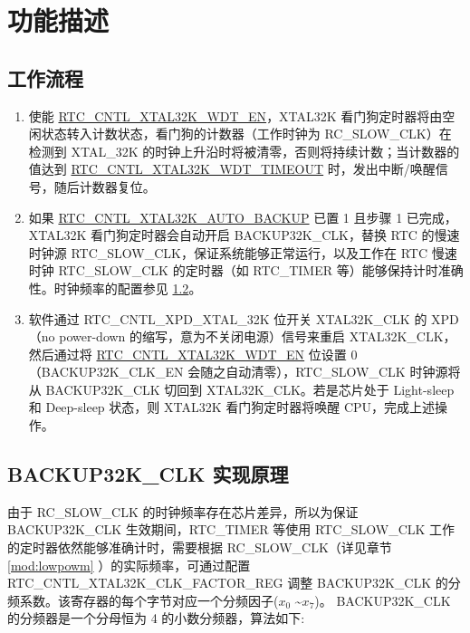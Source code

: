 \documentclass[main\_\_CN.tex]{subfiles}
\begin{document}
\section{功能描述}

\subsection{工作流程}

\begin{enumerate}
    \item 使能 \hyperref[fielddesc:RTCCNTLXTAL32KWDTEN]{RTC\_CNTL\_XTAL32K\_WDT\_EN}，XTAL32K 看门狗定时器将由空闲状态转入计数状态，看门狗的计数器（工作时钟为 RC\_SLOW\_CLK）在检测到 XTAL\_32K 的时钟上升沿时将被清零，否则将持续计数；当计数器的值达到 \hyperref[fielddesc:RTCCNTLXTAL32KWDTTIMEOUT]{RTC\_CNTL\_XTAL32K\_WDT\_TIMEOUT} 时，发出中断/唤醒信号，随后计数器复位。
    \item 如果 \hyperref[fielddesc:RTCCNTLXTAL32KAUTOBACKUP]{RTC\_CNTL\_XTAL32K\_AUTO\_BACKUP} 已置 1 且步骤 1 已完成，XTAL32K 看门狗定时器会自动开启 BACKUP32K\_CLK，替换 RTC 的慢速时钟源 RTC\_SLOW\_CLK，保证系统能够正常运行，以及工作在 RTC 慢速时钟 RTC\_SLOW\_CLK 的定时器（如 RTC\_TIMER 等）能够保持计时准确性。时钟频率的配置参见 \ref{sec:xtwdt-divisor-config}。
    \item 软件通过 RTC\_CNTL\_XPD\_XTAL\_32K 位开关 XTAL32K\_CLK 的 XPD（no power-down 的缩写，意为不关闭电源）信号来重启 XTAL32K\_CLK，然后通过将 \hyperref[fielddesc:RTCCNTLXTAL32KWDTEN]{RTC\_CNTL\_XTAL32K\_WDT\_EN} 位设置 0（BACKUP32K\_CLK\_EN 会随之自动清零），RTC\_SLOW\_CLK 时钟源将从 BACKUP32K\_CLK 切回到 XTAL32K\_CLK。若是芯片处于 Light-sleep 和 Deep-sleep 状态，则 XTAL32K 看门狗定时器将唤醒 CPU，完成上述操作。
\end{enumerate}


\subsection{BACKUP32K\_CLK 实现原理}\label{sec:xtwdt-divisor-config}
由于 RC\_SLOW\_CLK 的时钟频率存在芯片差异，所以为保证 BACKUP32K\_CLK 生效期间，RTC\_TIMER 等使用 RTC\_SLOW\_CLK 工作的定时器依然能够准确计时，需要根据 RC\_SLOW\_CLK（详见章节 \ref{mod:lowpowm}
     \textit{}）的实际频率，可通过配置 RTC\_CNTL\_XTAL32K\_CLK\_FACTOR\_REG 调整 BACKUP32K\_CLK 的分频系数。该寄存器的每个字节对应一个分频因子(\begin{math}x_0\end{math} \textasciitilde \begin{math}x_7\end{math})。
BACKUP32K\_CLK 的分频器是一个分母恒为 4 的小数分频器，算法如下:\\
\end{document}
